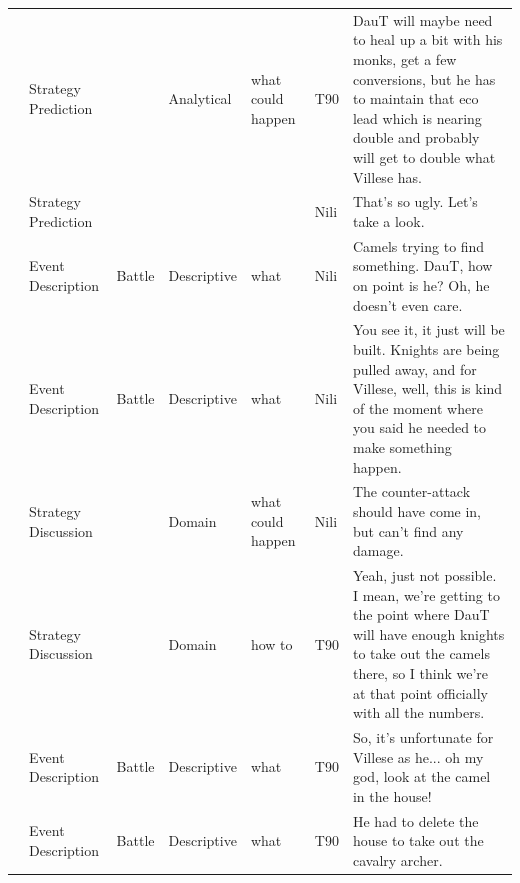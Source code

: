{\begin{longtable}{@{}>{\theAppRow}r|L{2.3cm}L{2.2cm}L{1.4cm}L{2.2cm}L{0.5cm}U{5.6cm}@{}}
    & Strategy Prediction   &                      & Analytical  & what could happen & T90     & DauT will maybe need to heal up a bit with his monks, get a few conversions, but he has to maintain that eco lead which is nearing double and probably will get to double what Villese has.                              \\
    & Strategy Prediction   &                      &             &                   & Nili    & That's so ugly. Let's take a look.                                                                                                                                                                                       \\
    & Event Description     & Battle               & Descriptive   & what              & Nili    & Camels trying to find something. DauT, how on point is he? Oh, he doesn't even care.                                                                                                                                     \\
    & Event Description     & Battle               & Descriptive   & what              & Nili    & You see it, it just will be built. Knights are being pulled away, and for Villese, well, this is kind of the moment where you said he needed to make something happen.                                                   \\
    & Strategy Discussion   &                      & Domain      & what could happen & Nili    & The counter-attack should have come in, but can't find any damage.                                                                                                                                                       \\
    & Strategy Discussion   &                      & Domain      & how to            & T90     & Yeah, just not possible. I mean, we're getting to the point where DauT will have enough knights to take out the camels there, so I think we're at that point officially with all the numbers.                            \\
    & Event Description     & Battle               & Descriptive   & what              & T90     & So, it's unfortunate for Villese as he... oh my god, look at the camel in the house!                                                                                                                                     \\
    & Event Description     & Battle               & Descriptive   & what              & T90     & He had to delete the house to take out the cavalry archer.                                                                                                                                                               \\

\end{longtable}}
